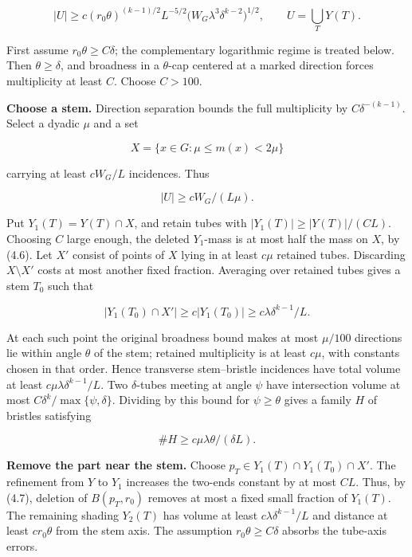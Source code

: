 \documentclass[
  11pt,
  a4paper,
]{article}
\begin{document}
\[|U|\ge c(r_0\theta)^{(k-1)/2}L^{-5/2}
 \bigl(W_G\lambda^3\delta^{k-2}\bigr)^{1/2},
 \qquad U=\bigcup_TY(T).
\tag{4.8}\label{eq:4.8}\]

First assume \(r_0\theta\ge C\delta\); the complementary logarithmic
regime is treated below. Then \(\theta\ge\delta\), and broadness in a
\(\theta\)-cap centered at a marked direction forces multiplicity at
least \(C\). Choose \(C>100\).

\textbf{Choose a stem.} Direction separation bounds the full
multiplicity by \(C\delta^{-(k-1)}\). Select a dyadic \(\mu\) and a set

\[X=\{x\in G:\mu\le m(x)<2\mu\}\]

carrying at least \(cW_G/L\) incidences. Thus

\[|U|\ge cW_G/(L\mu).
\tag{4.9}\label{eq:4.9}\]

Put \(Y_1(T)=Y(T)\cap X\), and retain tubes with
\(|Y_1(T)|\ge |Y(T)|/(CL)\). Choosing \(C\) large enough, the deleted
\(Y_1\)-mass is at most half the mass on \(X\), by (4.6). Let \(X'\)
consist of points of \(X\) lying in at least \(c\mu\) retained tubes.
Discarding \(X\setminus X'\) costs at most another fixed fraction.
Averaging over retained tubes gives a stem \(T_0\) such that

\[|Y_1(T_0)\cap X'|\ge c|Y_1(T_0)|
 \ge c\lambda\delta^{k-1}/L.
\tag{4.10}\label{eq:4.10}\]

At each such point the original broadness bound makes at most
\(\mu/100\) directions lie within angle \(\theta\) of the stem; retained
multiplicity is at least \(c\mu\), with constants chosen in that order.
Hence transverse stem--bristle incidences have total volume at least
\(c\mu\lambda\delta^{k-1}/L\). Two \(\delta\)-tubes meeting at angle
\(\psi\) have intersection volume at most
\(C\delta^k/\max\{\psi,\delta\}\). Dividing by this bound for
\(\psi\ge\theta\) gives a family \(H\) of bristles satisfying

\[\#H\ge c\mu\lambda\theta/(\delta L).
\tag{4.11}\label{eq:4.11}\]

\textbf{Remove the part near the stem.} Choose
\(p_T\in Y_1(T)\cap Y_1(T_0)\cap X'\). The refinement from \(Y\) to
\(Y_1\) increases the two-ends constant by at most \(CL\). Thus, by
(4.7), deletion of \(B(p_T,r_0)\) removes at most a fixed small fraction
of \(Y_1(T)\). The remaining shading \(Y_2(T)\) has volume at least
\(c\lambda\delta^{k-1}/L\) and distance at least \(cr_0\theta\) from the
stem axis. The assumption \(r_0\theta\ge C\delta\) absorbs the tube-axis
errors.
\end{document}
